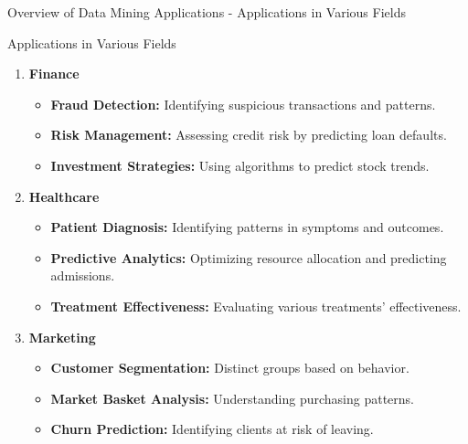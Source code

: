 \documentclass[aspectratio=169]{beamer}
\begin{document}
\begin{frame}[fragile]{Overview of Data Mining Applications - Applications in Various Fields}
    \begin{block}{Applications in Various Fields}
        \begin{enumerate}
            \item \textbf{Finance}
            \begin{itemize}
                \item \textbf{Fraud Detection:} Identifying suspicious transactions and patterns.
                \item \textbf{Risk Management:} Assessing credit risk by predicting loan defaults.
                \item \textbf{Investment Strategies:} Using algorithms to predict stock trends.
            \end{itemize}
            
            \item \textbf{Healthcare}
            \begin{itemize}
                \item \textbf{Patient Diagnosis:} Identifying patterns in symptoms and outcomes.
                \item \textbf{Predictive Analytics:} Optimizing resource allocation and predicting admissions.
                \item \textbf{Treatment Effectiveness:} Evaluating various treatments' effectiveness.
            \end{itemize}

            \item \textbf{Marketing}
            \begin{itemize}
                \item \textbf{Customer Segmentation:} Distinct groups based on behavior.
                \item \textbf{Market Basket Analysis:} Understanding purchasing patterns.
                \item \textbf{Churn Prediction:} Identifying clients at risk of leaving.
            \end{itemize}
        \end{enumerate}
    \end{block}
\end{frame}
\end{document}
